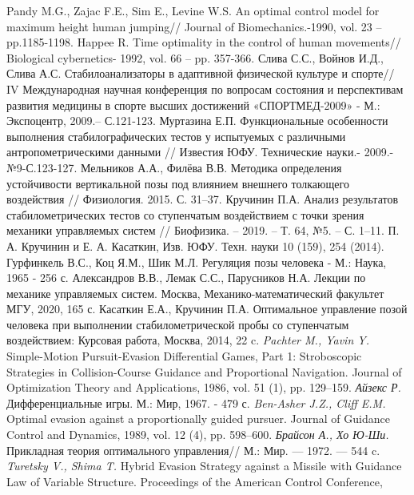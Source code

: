 \documentclass[a4paper,12pt, openany]{book}
\theoremstyle{plain} %
\theoremstyle{definition} %
\theoremstyle{remark} %
\numberwithin{equation}{chapter}
\begin{document}
{\begin{thebibliography}{15}
Pandy M.G., Zajac F.E., Sim E., Levine W.S. An optimal control model for maximum height human jumping// Journal of Biomechanics.-1990, vol. 23 – pp.1185-1198.
Happee R. Time optimality in the control of human movements// Biological cybernetics- 1992, vol. 66 – pp. 357-366.
Слива С.С., Войнов И.Д., Слива А.С. Стабилоанализаторы в адаптивной физической культуре и спорте// IV Международная научная конференция по вопросам состояния и перспективам развития медицины в спорте высших достижений «СПОРТМЕД-2009» - М.: Экспоцентр, 2009.– С.121-123.
Муртазина Е.П. Функциональные особенности выполнения стабилографических тестов у испытуемых с различными антропометрическими данными // Известия ЮФУ. Технические науки.- 2009.-№9-С.123-127.
Мельников А.А., Филёва В.В. Методика определения устойчивости вертикальной позы под влиянием внешнего толкающего воздействия // Физиология. 2015. С. 31–37.
Кручинин П.А. Анализ результатов стабилометрических тестов со ступенчатым воздействием с точки зрения механики управляемых систем
// Биофизика. – 2019. – Т. 64, №5. – С. 1–11.
 П. А. Кручинин и Е. А. Касаткин, Изв. ЮФУ.
Техн. науки 10 (159), 254 (2014).
Гурфинкель В.С., Коц Я.М., Шик М.Л. Регуляция позы человека - М.: Наука, 1965 - 256 с.
 Александров В.В., Лемак С.С., Парусников Н.А. Лекции по механике управляемых систем. Москва, Механико-математический факультет МГУ, 2020, 165 с.
 Касаткин Е.А., Кручинин П.А. Оптимальное управление позой человека
    при выполнении стабилометрической пробы со ступенчатым воздействием: Курсовая работа, Москва, 2014, 22 c.
 \textit{Pachter M., Yavin Y.} Simple-Motion Pursuit-Evasion Differential Games, Part 1: Stroboscopic Strategies in Collision-Course Guidance and Proportional Navigation. Journal of Optimization Theory and Applications, 1986, vol. 51 (1), pp. 129–159.
 \textit{Айзекс Р.} Дифференциальные игры. М.: Мир, 1967. - 479 с. 
 \textit{Ben-Asher J.Z., Cliff E.M.} Optimal evasion against a proportionally guided pursuer. Journal of Guidance Control and Dynamics, 1989,
vol. 12 (4), pp. 598–600.
 \textit{Брайсон А., Хо Ю-Ши.} Прикладная теория оптимального управления// М.: Мир. — 1972. — 544 c.
 \textit{Turetsky V., Shima T.} Hybrid Evasion Strategy against a Missile with Guidance
Law of Variable Structure. Proceedings of the American Control Conference,

\end{thebibliography}}
\end{document}
